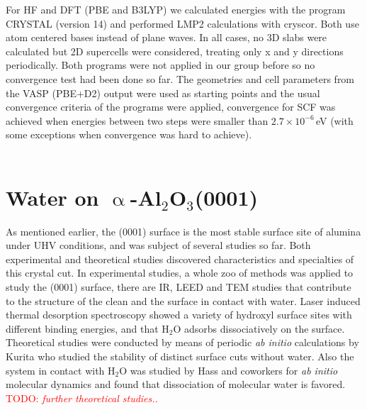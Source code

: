 \documentclass[11pt,DIV=13,BCOR=5mm,a4paper,headinclude]{scrbook}
\newcommand\todo[1]{\textcolor{red}{TODO: \textit{{#1}}}}
\begin{document}
For HF and DFT (PBE and B3LYP) we calculated energies with the program CRYSTAL\cite{crystal14} (version 14) and performed LMP2 calculations with cryscor\cite{cryscor}.
Both use atom centered bases instead of plane waves.
In all cases, no 3D slabs were calculated but 2D supercells were considered, treating only x and y directions periodically.
Both programs were not applied in our group before so no convergence test had been done so far.
The geometries and cell parameters from the VASP (PBE+D2) output were used as starting points and the usual convergence criteria of the programs were applied, convergence for SCF was achieved when energies between two steps were smaller than $2.7\times 10^{-6}\,$eV (with some exceptions when convergence was hard to achieve).
\\\\



\chapter{Water on $\upalpha$-Al$_2$O$_3$(0001)}\label{sec:0001}
As mentioned earlier, the (0001) surface is the most stable surface site of alumina under UHV conditions, and was subject of several studies so far\cite{kuri10,hass98,hass00,Elam1998,Brown1999,Kelber2007}.
Both experimental and theoretical studies discovered characteristics and specialties of this crystal cut.
In experimental studies, a whole zoo of methods was applied to study the (0001) surface, there are IR\cite{Tsyganenko1996}, LEED\cite{Chang1971} and TEM\cite{Lee1985} studies that contribute to the structure of the clean and the surface in contact with water.
Laser induced thermal desorption spectroscopy\cite{Elam1998,Nelson1998} showed a variety of hydroxyl surface sites with different binding energies, and that H$_2$O adsorbs dissociatively on the surface.
Theoretical studies were conducted by means of periodic \textit{ab initio} calculations by Kurita\cite{kuri10} who studied the stability of distinct surface cuts without water. Also the system in contact with H$_2$O was studied by Hass and coworkers\cite{hass98,hass00} for \textit{ab initio} molecular dynamics and found that dissociation of molecular water is favored.
\todo{further theoretical studies..}
\\
\end{document}
